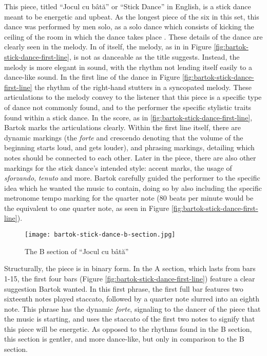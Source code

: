 This piece, titled ``Jocul cu bâtă'' or ``Stick Dance'' in English, is a stick dance meant to be energetic and upbeat. As the longest piece of the six in this set, this dance was performed by men solo, as a solo dance which consists of kicking the ceiling of the room in which the dance takes place \autocite{Weissmann_1969}. These details of the dance are clearly seen in the melody. In of itself, the melody, as in  in Figure \ref{fig:bartok-stick-dance-first-line}\autocite{Lung_2016}, is not as danceable as the title suggests. Instead, the melody is more elegant in sound, with the rhythm not lending itself easily to a dance-like sound. In the first line of the dance in Figure \ref{fig:bartok-stick-dance-first-line}\autocite{Lung_2016} the rhythm of the right-hand stutters in a syncopated melody. These articulations to the melody convey to the listener that this piece is a specific type of dance not commonly found, and to the performer the specific stylistic traits found within a stick dance. In the score, as in \ref{fig:bartok-stick-dance-first-line}\autocite{Lung_2016}, Bartok marks the articulations clearly. Within the first line itself, there are dynamic markings (the \textit{forte} and crescendo denoting that the volume of the beginning starts loud, and gets louder), and phrasing markings, detailing which notes should be connected to each other. Later in the piece, there are also other markings for the stick dance's intended style: accent marks, the usage of \textit{sforzando}, \textit{tenuto} and more. Bartok carefully guided the performer to the specific idea which he wanted the music to contain, doing so by also including the specific metronome tempo marking for the quarter note (80 beats per minute would be the equivalent to one quarter note, as seen in Figure \ref{fig:bartok-stick-dance-first-line}\autocite{Lung_2016}).

\begin{figure}
  \centering
  \texttt{[image: bartok-stick-dance-b-section.jpg]}
  \caption[The B Section, of ``Jocul cu bâtă'' in Bartok's \textit{Romanian Folk Dances, Sz. 56, BB 68}]{The B section of ``Jocul cu bâtă''}
  \label{fig:bartok-stick-dance-b-section}
\end{figure}


Structurally, the piece is in binary form. In the A section, which lasts from bars 1-15, the first four bars (Figure \ref{fig:bartok-stick-dance-first-line}\autocite{Lung_2016}) feature a clear suggestion Bartok wanted. In this first phrase, the first full bar features two sixteenth notes played staccato, followed by a quarter note slurred into an eighth note. This phrase has the dynamic \textit{forte}, signaling to the dancer of the piece that the music is starting, and uses the staccato of the first two notes to signify that this piece will be energetic. As opposed to the rhythms found in the B section, this section is gentler, and more dance-like, but only in comparison to the B section. 

